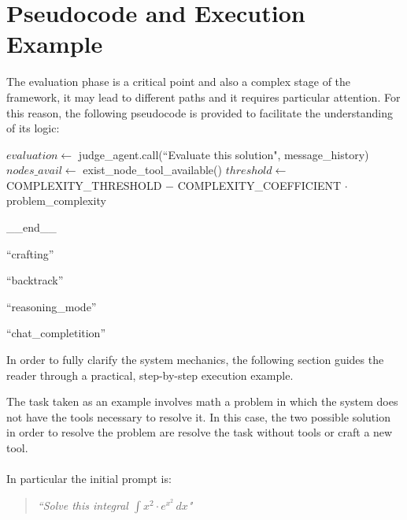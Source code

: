 \documentclass[12pt,a4paper,openright,twoside]{book}
\begin{document}
\section{Pseudocode and Execution Example}

The evaluation phase is a critical point and also a complex stage of the framework, it may lead to different paths and it requires particular attention. 
For this reason, the following pseudocode is provided to facilitate the understanding of its logic: 

\begin{algorithm}
\begin{algorithmic}[1]
    \State $evaluation \gets$ judge\_agent.call(``Evaluate this solution", message\_history)
    \State $nodes\_avail \gets$ exist\_node\_tool\_available()
    \State $threshold \gets$ COMPLEXITY\_THRESHOLD $-$ COMPLEXITY\_COEFFICIENT $\cdot$ problem\_complexity

        \State \Return \_\_end\_\_

        \State \Return ``crafting''

        \State \Return ``backtrack''

        \State \Return ``reasoning\_mode''

    \Else
        \State \Return ``chat\_completition''
    \EndIf
\EndProcedure
\end{algorithmic}
\end{algorithm}
\newpage
In order to fully clarify the system mechanics, the following section guides the reader through a practical, step-by-step execution example.

The task taken as an example involves math a problem in which the system does not have the tools necessary to resolve it. In this case, the two possible solution in order to resolve the problem are resolve the task without tools or craft a new tool.
\\\\
In particular the initial prompt is:
\begin{quote}
    \textit{``Solve this integral $\int x^2 \cdot e^{x^2} \, dx$"}
\end{quote} 
\end{document}
